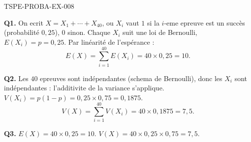 \begin{corrige}{TSPE-PROBA-EX-008}

\textbf{Q1.} On ecrit $X=X_1+\cdots+X_{40}$, ou $X_i$ vaut $1$ si la $i$-eme epreuve est un succès (probabilité $0{,}25$), $0$ sinon. Chaque $X_i$ suit une loi de Bernoulli, $E(X_i)=p=0{,}25$. Par linéarité de l'espérance :
\[
  E(X) = \sum_{i=1}^{40} E(X_i) = 40\times0{,}25 = 10.
\]

\textbf{Q2.} Les $40$ epreuves sont indépendantes (schema de Bernoulli), donc les $X_i$ sont indépendantes : l'additivite de la variance s'applique. $V(X_i)=p(1-p)=0{,}25\times0{,}75=0{,}1875$.
\[
  V(X) = \sum_{i=1}^{40} V(X_i) = 40\times0{,}1875 = 7{,}5.
\]

\textbf{Q3.} $E(X) = 40\times0{,}25 = \boxed{10}$. $V(X) = 40\times0{,}25\times0{,}75 = \boxed{7{,}5}$.

\end{corrige}

